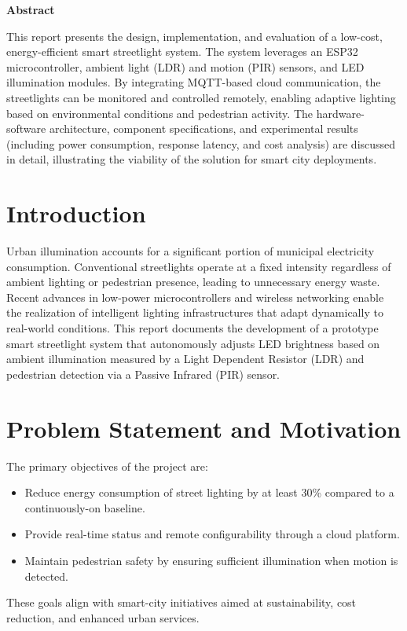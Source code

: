 \documentclass[12pt, a4paper]{article}
\begin{document}
\begin{center}
    \Large\textbf{Abstract}
\end{center}
\vspace{0.5cm}

\noindent
This report presents the design, implementation, and evaluation of a low-cost, energy-efficient smart streetlight system. The system leverages an ESP32 microcontroller, ambient light (LDR) and motion (PIR) sensors, and LED illumination modules. By integrating MQTT-based cloud communication, the streetlights can be monitored and controlled remotely, enabling adaptive lighting based on environmental conditions and pedestrian activity. The hardware-software architecture, component specifications, and experimental results (including power consumption, response latency, and cost analysis) are discussed in detail, illustrating the viability of the solution for smart city deployments.


\tableofcontents
\newpage

\section{Introduction}
Urban illumination accounts for a significant portion of municipal electricity consumption. Conventional streetlights operate at a fixed intensity regardless of ambient lighting or pedestrian presence, leading to unnecessary energy waste. Recent advances in low-power microcontrollers and wireless networking enable the realization of intelligent lighting infrastructures that adapt dynamically to real-world conditions. This report documents the development of a prototype smart streetlight system that autonomously adjusts LED brightness based on ambient illumination measured by a Light Dependent Resistor (LDR) and pedestrian detection via a Passive Infrared (PIR) sensor.

\section{Problem Statement and Motivation}
The primary objectives of the project are:
\begin{itemize}
  \item Reduce energy consumption of street lighting by at least 30\% compared to a continuously-on baseline.
  \item Provide real-time status and remote configurability through a cloud platform.
  \item Maintain pedestrian safety by ensuring sufficient illumination when motion is detected.
\end{itemize}
These goals align with smart-city initiatives aimed at sustainability, cost reduction, and enhanced urban services.
\end{document}
